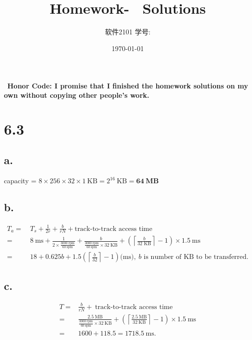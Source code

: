 \documentclass[11pt]{article}  %
\title{\vspace{-4cm}\CourseCodeName \space
        \Session \protect\\  Homework-~\textbf{\Homework} Solutions}
\author{软件2101 \Name \space 学号: \SID}
\date{\today}
\begin{document}
\maketitle

~\textbf{Honor Code: I promise that I finished the homework solutions on my own without copying other people's 
    work.}
    
\section*{6.3 }

\subsection*{a. }

capacity = $8\times 256 \times 32 \times 1~\text{KB} = 2^{16}~\text{KB} = \mathbf{64}~\textbf{MB}$

\subsection*{b.}
\vspace{-0.5cm}
$$
\begin{aligned}
    T_{a}=~&T_{s}+\frac{1}{2 r}+\frac{b}{r N} +\text{track-to-track access time}\\
    =~&8 ~\text{ms}+\frac{1}{2\times \frac{3000 ~\text{rpm} }{60 ~\text{spm}}}+
\frac{b}{\frac{3000 ~\text{rpm} }{60 ~\text{spm}}\times32~\text{KB}}+ \left(\left \lceil \frac{b}{32 \text{ KB}} \right \rceil - 1\right)\times 1.5~\text{ms}\\
    =~&18+0.625b+1.5\left(\left \lceil \frac{b}{32 } \right \rceil - 1\right) \text{(ms)}, ~b\text{ is number of KB to be transferred}. 
\end{aligned}
$$

\subsection*{c.}
\vspace{-0.5cm}
$$
\begin{aligned}
    T =& \frac{b}{r N} + ~\text{track-to-track access time} \\
    =&\frac{2.5~\text{MB}}{\frac{3000 ~\text{rpm} }{60 ~\text{spm}}\times32~\text{KB}} + 
        \left(\left \lceil \frac{2.5~\text{MB}}{32~\text{KB}} \right \rceil - 1\right) \times 1.5~\text{ms}\\
    = & 1600 + 118.5 = 1718.5~\text{ms} .
\end{aligned}
$$
\end{document}
